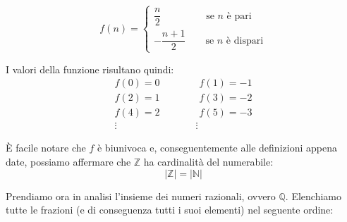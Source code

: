 \begin{equation*}
	f(n) =
	\begin{cases}
		\dfrac{n}{2} \qquad \qquad \;\; \text{se $n$ è pari}\\
		-\dfrac{n+1}{2} \qquad \text{se $n$ è dispari}
	\end{cases}
\end{equation*}

I valori della funzione risultano quindi:
\begin{align*}
    f(0) = 0 \qquad \qquad f(1) = -1\\
    f(2) = 1 \qquad \qquad f(3) = -2\\
    f(4) = 2 \qquad \qquad f(5) = -3\\
    \vdots \qquad \qquad \qquad \qquad \vdots \qquad
\end{align*}

È facile notare che $f$ è biunivoca e, conseguentemente alle definizioni appena date, possiamo affermare che $\mathbb{Z}$ ha cardinalità del numerabile:
\begin{equation*}
    |\mathbb{Z}| = |\mathbb{N}|
\end{equation*}

Prendiamo ora in analisi l'insieme dei numeri razionali, ovvero $\mathbb{Q}$. Elenchiamo tutte le frazioni (e di conseguenza tutti i suoi elementi) nel seguente ordine:

